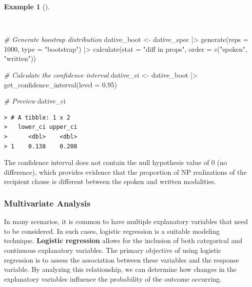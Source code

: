 \documentclass[
  letterpaper,
]{latex/krantz}
\newenvironment{Shaded}{\begin{snugshade}}{\end{snugshade}}
\newcommand{\AttributeTok}[1]{\textcolor[rgb]{0.00,0.00,0.00}{#1}}
\newcommand{\CommentTok}[1]{\textcolor[rgb]{0.00,0.00,0.00}{\textit{#1}}}
\newcommand{\DecValTok}[1]{\textcolor[rgb]{0.00,0.00,0.00}{#1}}
\newcommand{\FloatTok}[1]{\textcolor[rgb]{0.00,0.00,0.00}{#1}}
\newcommand{\FunctionTok}[1]{\textcolor[rgb]{0.00,0.00,0.00}{#1}}
\newcommand{\NormalTok}[1]{\textcolor[rgb]{0.00,0.00,0.00}{#1}}
\newcommand{\OtherTok}[1]{\textcolor[rgb]{0.00,0.00,0.00}{#1}}
\newcommand{\SpecialCharTok}[1]{\textcolor[rgb]{0.00,0.00,0.00}{#1}}
\newcommand{\StringTok}[1]{\textcolor[rgb]{0.00,0.00,0.00}{#1}}
\theoremstyle{definition}
\newtheorem{example}{Example}[chapter]
\theoremstyle{remark}
\begin{document}
\begin{example}[]\protect\hypertarget{exm-ida-cat-confidence-interval-bivariate}{}\label{exm-ida-cat-confidence-interval-bivariate}

~

\begin{Shaded}
\begin{Highlighting}[]
\CommentTok{\# Generate boostrap distribution}
\NormalTok{dative\_boot }\OtherTok{\textless{}{-}}
\NormalTok{  dative\_spec }\SpecialCharTok{|\textgreater{}}
  \FunctionTok{generate}\NormalTok{(}\AttributeTok{reps =} \DecValTok{1000}\NormalTok{, }\AttributeTok{type =} \StringTok{"bootstrap"}\NormalTok{) }\SpecialCharTok{|\textgreater{}}
  \FunctionTok{calculate}\NormalTok{(}\AttributeTok{stat =} \StringTok{"diff in props"}\NormalTok{, }\AttributeTok{order =} \FunctionTok{c}\NormalTok{(}\StringTok{"spoken"}\NormalTok{, }\StringTok{"written"}\NormalTok{))}

\CommentTok{\# Calculate the confidence interval}
\NormalTok{dative\_ci }\OtherTok{\textless{}{-}}
\NormalTok{  dative\_boot }\SpecialCharTok{|\textgreater{}}
  \FunctionTok{get\_confidence\_interval}\NormalTok{(}\AttributeTok{level =} \FloatTok{0.95}\NormalTok{)}

\CommentTok{\# Preview}
\NormalTok{dative\_ci}
\end{Highlighting}
\end{Shaded}

\begin{verbatim}
> # A tibble: 1 x 2
>   lower_ci upper_ci
>      <dbl>    <dbl>
> 1    0.138    0.208
\end{verbatim}

\end{example}

The confidence interval does not contain the null hypothesis value of 0
(no difference), which provides evidence that the proportion of NP
realizations of the recipient clause is different between the spoken and
written modalities.

\subsubsection{Multivariate Analysis}\label{multivariate-analysis}

In many scenarios, it is common to have multiple explanatory variables
that need to be considered. In such cases, logistic regression is a
suitable modeling technique. \textbf{Logistic regression} allows for the
inclusion of both categorical and continuous explanatory variables. The
primary objective of using logistic regression is to assess the
association between these variables and the response variable. By
analyzing this relationship, we can determine how changes in the
explanatory variables influence the probability of the outcome
occurring.
\end{document}
